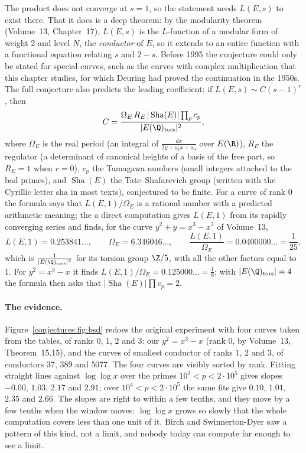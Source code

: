 The product does not converge at $s=1$, so the statement needs $L(E,s)$ to exist there. That it does is a deep theorem: by the modularity theorem
(Volume~13, Chapter~17), $L(E,s)$ is the $L$-function of a modular form of weight $2$ and level $N$, the \emph{conductor} of $E$, so it extends to an entire
function with a functional equation relating $s$ and $2-s$. Before 1995 the conjecture could only be stated for special curves, such as the curves with
complex multiplication that this chapter studies, for which Deuring had proved the continuation in the 1950s. The full conjecture also predicts the leading
coefficient: if $L(E,s)\sim C(s-1)^r$, then
\[
C=\frac{\Omega_E\,R_E\,|\operatorname{Sha}(E)|\prod_pc_p}{|E(\Q)_{\mathrm{tors}}|^2},
\]
where $\Omega_E$ is the real period (an integral of $\frac{dx}{2y+a_1x+a_3}$ over $E(\R)$), $R_E$ the regulator (a determinant of canonical heights of a basis
of the free part, so $R_E=1$ when $r=0$), $c_p$ the Tamagawa numbers (small integers attached to the bad primes), and $\operatorname{Sha}(E)$ the Tate--Shafarevich group (written with the Cyrillic letter sha in most texts),
conjectured to be finite. For a curve of rank $0$ the formula says that $L(E,1)/\Omega_E$ is a rational number with a predicted arithmetic meaning; the
a direct computation gives $L(E,1)$ from its rapidly converging series and finds, for the curve $y^2+y=x^3-x^2$ of Volume~13,
\[
L(E,1)=0.253841\ldots,\qquad\Omega_E=6.346046\ldots,\qquad\frac{L(E,1)}{\Omega_E}=0.0400000\ldots=\frac1{25},
\]
which is $\frac1{|E(\Q)_{\mathrm{tors}}|^2}$ for its torsion group $\Z/5$, with all the other factors equal to $1$. For $y^2=x^3-x$ it finds
$L(E,1)/\Omega_E=0.125000\ldots=\frac18$; with $|E(\Q)_{\mathrm{tors}}|=4$ the formula then asks that $|\operatorname{Sha}(E)|\prod c_p=2$.

\paragraph{The evidence.} Figure~\ref{conjectures:fig:bsd} redoes the original experiment with four curves taken from the tables, of ranks $0$, $1$, $2$ and $3$: our
$y^2=x^3-x$ (rank $0$, by Volume~13, Theorem~15.15), and the curves of smallest conductor of ranks $1$, $2$ and $3$, of conductors $37$, $389$ and $5077$. The
four curves are visibly sorted by rank. Fitting straight lines against $\log\log x$ over the primes $10^3<p<2\cdot10^5$ gives slopes $-0.00$, $1.03$,
$2.17$ and $2.91$; over $10^4<p<2\cdot10^5$ the same fits give $0.10$, $1.01$, $2.35$ and $2.66$. The slopes are right to within a few tenths, and they move
by a few tenths when the window moves: $\log\log x$ grows so slowly that the whole computation covers less than one unit of it. Birch and Swinnerton-Dyer
saw a pattern of this kind, not a limit, and nobody today can compute far enough to see a limit.

